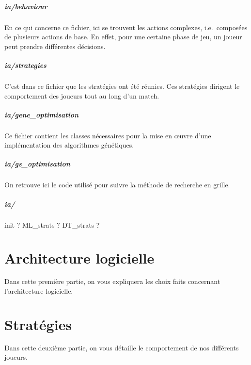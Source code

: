 \documentclass[12pt,a4paper]{article}
\begin{document}
\subsubsection*{ia/behaviour}
En ce qui concerne ce fichier, ici se trouvent les actions complexes, i.e.\ 
compos\'ees de plusieurs actions de base. En effet, pour une certaine phase de 
jeu, un joueur peut prendre diff\'erentes d\'ecisions.

\subsubsection*{ia/strategies}
C'est dans ce fichier que les strat\'egies ont \'et\'e r\'eunies. Ces 
strat\'egies dirigent le comportement des joueurs tout au long d'un 
match.

\subsubsection*{ia/gene\_optimisation}
Ce fichier contient les classes n\'ecessaires pour la mise en \oe uvre d'une 
impl\'ementation des algorithmes g\'en\'etiques.

\subsubsection*{ia/gs\_optimisation}
On retrouve ici le code utilis\'e pour suivre la m\'ethode de recherche en 
grille.

\subsubsection*{ia/}
init ? ML\_strats ? DT\_strats ? 

\newpage

\part{Architecture logicielle} %
Dans cette premi\`ere partie, on vous expliquera les choix faits 
concernant l'architecture logicielle.

\newpage

\part{Strat\'egies}
Dans cette deuxi\`eme partie, on vous d\'etaille le comportement de nos 
diff\'erents joueurs.
\end{document}
